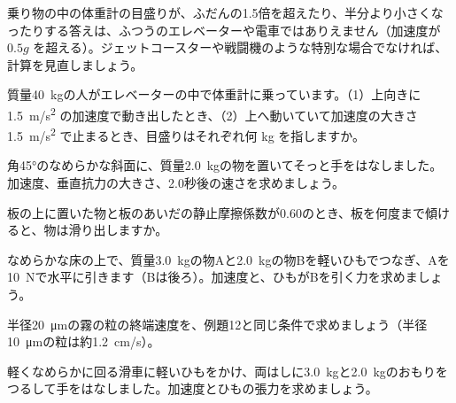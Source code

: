 \begin{phkougaku}[エレベーターを設計する]
\begin{phketa}[力と加速度]
乗り物の中の体重計の目盛りが、ふだんの1.5倍を超えたり、半分より小さくなったりする答えは、ふつうのエレベーターや電車ではありえません（加速度が $0.5g$ を超える）。ジェットコースターや戦闘機のような特別な場合でなければ、計算を見直しましょう。
\end{phketa}
\end{phkougaku}



\bkendproblems
{}
\bkproblem 質量\qty{40}{kg}の人がエレベーターの中で体重計に乗っています。（1）上向きに \qty{1.5}{m/s^2} の加速度で動き出したとき、（2）上へ動いていて加速度の大きさ \qty{1.5}{m/s^2} で止まるとき、目盛りはそれぞれ何 kg を指しますか。

\bkproblem 角45°のなめらかな斜面に、質量\qty{2.0}{kg}の物を置いてそっと手をはなしました。加速度、垂直抗力の大きさ、2.0秒後の速さを求めましょう。

\bkproblem 板の上に置いた物と板のあいだの静止摩擦係数が0.60のとき、板を何度まで傾けると、物は滑り出しますか。

\bkproblem なめらかな床の上で、質量\qty{3.0}{kg}の物Aと\qty{2.0}{kg}の物Bを軽いひもでつなぎ、Aを\qty{10}{N}で水平に引きます（Bは後ろ）。加速度と、ひもがBを引く力を求めましょう。

\bkproblem 半径\qty{20}{\micro m}の霧の粒の終端速度を、例題12と同じ条件で求めましょう（半径\qty{10}{\micro m}の粒は約\qty{1.2}{cm/s}）。

\bkproblem 軽くなめらかに回る滑車に軽いひもをかけ、両はしに\qty{3.0}{kg}と\qty{2.0}{kg}のおもりをつるして手をはなしました。加速度とひもの張力を求めましょう。

